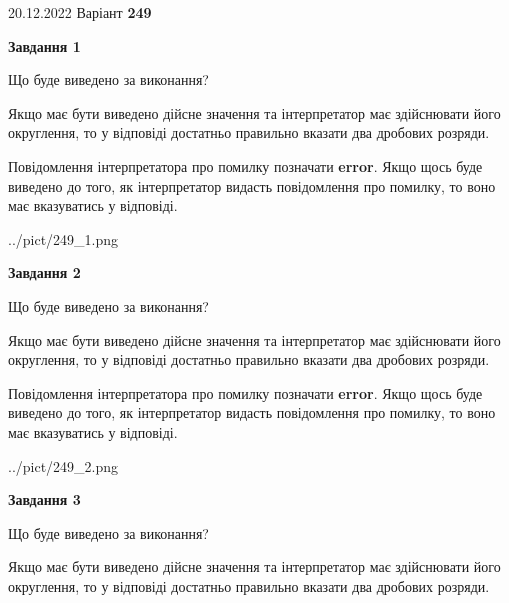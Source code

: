 \documentclass[12pt, ukrainian]{article}
\begin{document}
{20.12.2022 Варіант \No \textbf { 249 }\par}
{
\begin {Large}

{\begin {center}\textbf{Завдання 1}\end {center}}\par
Що буде виведено за виконання? \par

Якщо має бути виведено дійсне значення та інтерпретатор має здійснювати його округлення, 
то у відповіді достатньо правильно вказати два дробових розряди.

Повідомлення інтерпретатора про помилку позначати \textbf{error}.
Якщо щось буде виведено до того, як інтерпретатор видасть повідомлення про помилку, 
то воно має вказуватись у відповіді. \par

\begin{center}
	{../pict/249_1.png}
\end{center}
\newpage

{\begin {center}\textbf{Завдання 2}\end {center}}\par
Що буде виведено за виконання? \par

Якщо має бути виведено дійсне значення та інтерпретатор має здійснювати його округлення, 
то у відповіді достатньо правильно вказати два дробових розряди.

Повідомлення інтерпретатора про помилку позначати \textbf{error}.
Якщо щось буде виведено до того, як інтерпретатор видасть повідомлення про помилку, 
то воно має вказуватись у відповіді. \par

\begin{center}
	{../pict/249_2.png}
\end{center}
\newpage

{\begin {center}\textbf{Завдання 3}\end {center}}\par
Що буде виведено за виконання? \par

Якщо має бути виведено дійсне значення та інтерпретатор має здійснювати його округлення, 
то у відповіді достатньо правильно вказати два дробових розряди.


\end{Large}}
\end{document}
